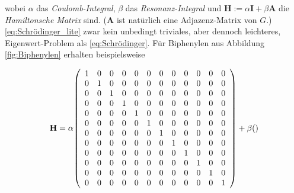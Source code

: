         wobei $\alpha$ das \textit{Coulomb-Integral}, $\beta$ das \textit{Resonanz-Integral} und $\mathbf H := \alpha \mathbf I + \beta \mathbf A$ die \textit{Hamiltonsche Matrix} sind.
        ($\mathbf A$ ist natürlich eine Adjazenz-Matrix von $G$.)
        \eqref{eq:Schrödinger_lite} zwar kein unbedingt triviales, aber dennoch leichteres, Eigenwert-Problem als \eqref{eq:Schrödinger}.
        Für Biphenylen aus Abbildung \ref{fig:Biphenylen} erhalten beispielsweise

        \resizebox{\linewidth}{!}
        {
            \begin{minipage}{\linewidth}
                \begin{align*}
                    \mathbf H
                    =
                    \alpha
                    {\left ( 
                        \begin{array}{cccccccccccc}
                            1 & 0 & 0 & 0 & 0 & 0 & 0 & 0 & 0 & 0 & 0 & 0 \\
                            0 & 1 & 0 & 0 & 0 & 0 & 0 & 0 & 0 & 0 & 0 & 0 \\
                            0 & 0 & 1 & 0 & 0 & 0 & 0 & 0 & 0 & 0 & 0 & 0 \\
                            0 & 0 & 0 & 1 & 0 & 0 & 0 & 0 & 0 & 0 & 0 & 0 \\
                            0 & 0 & 0 & 0 & 1 & 0 & 0 & 0 & 0 & 0 & 0 & 0 \\
                            0 & 0 & 0 & 0 & 0 & 1 & 0 & 0 & 0 & 0 & 0 & 0 \\
                            0 & 0 & 0 & 0 & 0 & 0 & 1 & 0 & 0 & 0 & 0 & 0 \\
                            0 & 0 & 0 & 0 & 0 & 0 & 0 & 1 & 0 & 0 & 0 & 0 \\
                            0 & 0 & 0 & 0 & 0 & 0 & 0 & 0 & 1 & 0 & 0 & 0 \\
                            0 & 0 & 0 & 0 & 0 & 0 & 0 & 0 & 0 & 1 & 0 & 0 \\
                            0 & 0 & 0 & 0 & 0 & 0 & 0 & 0 & 0 & 0 & 1 & 0 \\
                            0 & 0 & 0 & 0 & 0 & 0 & 0 & 0 & 0 & 0 & 0 & 1 \\
                        \end{array}
                     \right )}
                    +
                    \beta
                    {\left ( 
                        \begin{array}{cccccccccccc}

\end{array} \right )}
\end{align*}
\end{minipage}}
